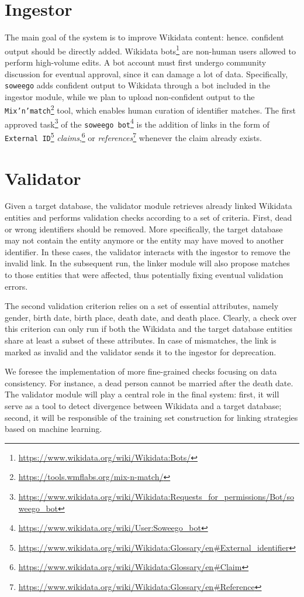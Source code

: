 \section{Ingestor}
\label{cha:43}
The main goal of the system is to improve Wikidata content: hence. confident output should be directly added. Wikidata bots\footnote{\url{https://www.wikidata.org/wiki/Wikidata:Bots/}} are non-human users allowed to perform high-volume edits. A bot account must first undergo community discussion for eventual approval, since it can damage a lot of data.
Specifically, \texttt{soweego} adds confident output to Wikidata through a bot included in the ingestor module, while we plan to upload non-confident output to the \texttt{Mix'n'match}\footnote{\url{https://tools.wmflabs.org/mix-n-match/}} tool, which enables human curation of identifier matches.
The first approved task\footnote{\url{https://www.wikidata.org/wiki/Wikidata:Requests_for_permissions/Bot/soweego_bot}} of the \texttt{soweego bot}\footnote{\url{https://www.wikidata.org/wiki/User:Soweego_bot}} is the addition of links in the form of \texttt{External ID}\footnote{\url{https://www.wikidata.org/wiki/Wikidata:Glossary/en\#External_identifier}} \textit{claims},\footnote{\url{https://www.wikidata.org/wiki/Wikidata:Glossary/en\#Claim}} or \textit{references}\footnote{\url{https://www.wikidata.org/wiki/Wikidata:Glossary/en\#Reference}} whenever the claim already exists.


\section{Validator}
\label{cha:44}
Given a target database, the validator module retrieves already linked Wikidata entities and performs validation checks according to a set of criteria. First, dead or wrong identifiers should be removed. More specifically, the target database may not contain the entity anymore or the entity may have moved to another identifier. In these cases, the validator interacts with the ingestor to remove the invalid link.
In the subsequent run, the linker module will also propose matches to those entities that were affected, thus potentially fixing eventual validation errors.

The second validation criterion relies on a set of essential attributes, namely gender, birth date, birth place, death date, and death place. Clearly, a check over this criterion can only run if both the Wikidata and the target database entities share at least a subset of these attributes. In case of mismatches, the link is marked as invalid and the validator sends it to the ingestor for deprecation.

We foresee the implementation of more fine-grained checks focusing on data consistency. For instance, a dead person cannot be married after the death date.
The validator module will play a central role in the final system: first, it will serve as a tool to detect divergence between Wikidata and a target database; second, it will be responsible of the training set construction for linking strategies based on machine learning.

